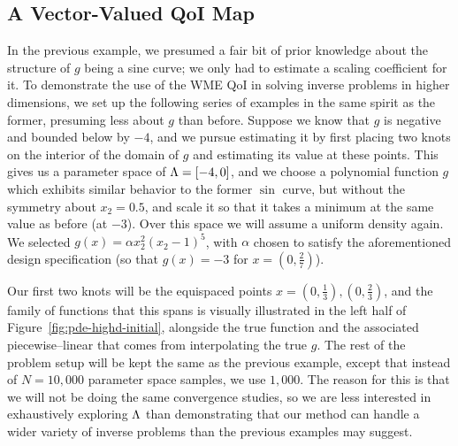 \subsection{A Vector-Valued QoI Map}
In the previous example, we presumed a fair bit of prior knowledge about the structure of $g$ being a sine curve; we only had to estimate a scaling coefficient for it.
To demonstrate the use of the WME QoI in solving inverse problems in higher dimensions, we set up the following series of examples in the same spirit as the former, presuming less about $g$ than before.
Suppose we know that $g$ is negative and bounded below by $-4$, and we pursue estimating it by first placing two knots on the interior of the domain of $g$ and estimating its value at these points.
This gives us a parameter space of ${\Lambda} = [-4, 0]$, and we choose a polynomial function $g$ which exhibits similar behavior to the former $\sin$ curve, but without the symmetry about $x_2=0.5$, and scale it so that it takes a minimum at the same value as before (at $-3$).
Over this space we will assume a uniform density again.
We selected $g(x) = \alpha x_2^2 (x_2 - 1)^5$, with $\alpha$ chosen to satisfy the aforementioned design specification (so that $g(x)=-3$ for $x=(0,\frac{2}{7})$).

Our first two knots will be the equispaced points $x = (0,\frac{1}{3}), (0,\frac{2}{3})$, and the family of functions that this spans is visually illustrated in the left half of Figure~\ref{fig:pde-highd-initial}, alongside the true function and the associated piecewise--linear that comes from interpolating the true $g$.
The rest of the problem setup will be kept the same as the previous example, except that instead of $N=10,000$ parameter space samples, we use $1,000$.
The reason for this is that we will not be doing the same convergence studies, so we are less interested in exhaustively exploring ${\Lambda}$ than demonstrating that our method can handle a wider variety of inverse problems than the previous examples may suggest.


